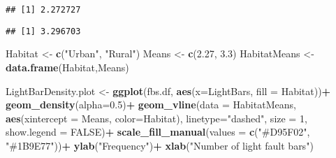 \documentclass[
]{article}
\newenvironment{Shaded}{\begin{snugshade}}{\end{snugshade}}
\newcommand{\AttributeTok}[1]{\textcolor[rgb]{0.13,0.29,0.53}{#1}}
\newcommand{\ConstantTok}[1]{\textcolor[rgb]{0.56,0.35,0.01}{#1}}
\newcommand{\DecValTok}[1]{\textcolor[rgb]{0.00,0.00,0.81}{#1}}
\newcommand{\FloatTok}[1]{\textcolor[rgb]{0.00,0.00,0.81}{#1}}
\newcommand{\FunctionTok}[1]{\textcolor[rgb]{0.13,0.29,0.53}{\textbf{#1}}}
\newcommand{\NormalTok}[1]{#1}
\newcommand{\OtherTok}[1]{\textcolor[rgb]{0.56,0.35,0.01}{#1}}
\newcommand{\SpecialCharTok}[1]{\textcolor[rgb]{0.81,0.36,0.00}{\textbf{#1}}}
\newcommand{\StringTok}[1]{\textcolor[rgb]{0.31,0.60,0.02}{#1}}
\begin{document}
\begin{verbatim}
## [1] 2.272727
\end{verbatim}

\begin{Shaded}
\end{Shaded}

\begin{verbatim}
## [1] 3.296703
\end{verbatim}

\begin{Shaded}
\begin{Highlighting}[]
\NormalTok{Habitat }\OtherTok{\textless{}{-}} \FunctionTok{c}\NormalTok{(}\StringTok{"Urban"}\NormalTok{, }\StringTok{"Rural"}\NormalTok{)}
\NormalTok{Means }\OtherTok{\textless{}{-}} \FunctionTok{c}\NormalTok{(}\FloatTok{2.27}\NormalTok{, }\FloatTok{3.3}\NormalTok{)}
\NormalTok{HabitatMeans }\OtherTok{\textless{}{-}} \FunctionTok{data.frame}\NormalTok{(Habitat,Means)}

\NormalTok{LightBarDensity.plot }\OtherTok{\textless{}{-}} \FunctionTok{ggplot}\NormalTok{(fbs.df, }\FunctionTok{aes}\NormalTok{(}\AttributeTok{x=}\NormalTok{LightBars, }\AttributeTok{fill =}\NormalTok{ Habitat))}\SpecialCharTok{+}
  \FunctionTok{geom\_density}\NormalTok{(}\AttributeTok{alpha=}\FloatTok{0.5}\NormalTok{)}\SpecialCharTok{+}
  \FunctionTok{geom\_vline}\NormalTok{(}\AttributeTok{data =}\NormalTok{ HabitatMeans, }\FunctionTok{aes}\NormalTok{(}\AttributeTok{xintercept =}\NormalTok{ Means, }\AttributeTok{color=}\NormalTok{Habitat),}
             \AttributeTok{linetype=}\StringTok{"dashed"}\NormalTok{,}
             \AttributeTok{size =} \DecValTok{1}\NormalTok{,}
             \AttributeTok{show.legend =} \ConstantTok{FALSE}\NormalTok{)}\SpecialCharTok{+}
  \FunctionTok{scale\_fill\_manual}\NormalTok{(}\AttributeTok{values =} \FunctionTok{c}\NormalTok{(}\StringTok{"\#D95F02"}\NormalTok{, }\StringTok{"\#1B9E77"}\NormalTok{))}\SpecialCharTok{+}
  \FunctionTok{ylab}\NormalTok{(}\StringTok{"Frequency"}\NormalTok{)}\SpecialCharTok{+}
  \FunctionTok{xlab}\NormalTok{(}\StringTok{"Number of light fault bars"}\NormalTok{)}
\end{Highlighting}
\end{Shaded}
\end{document}
